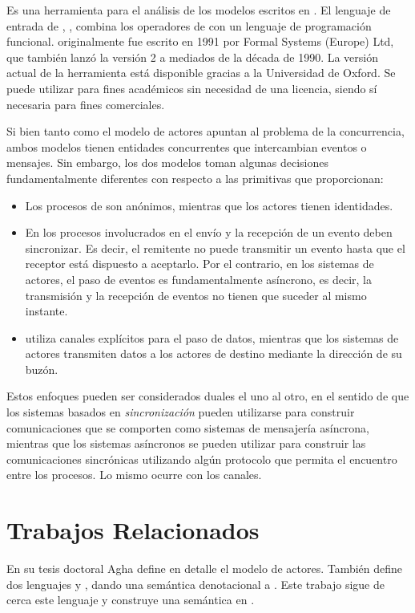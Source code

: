 Es una herramienta para el análisis de los modelos escritos en \CSP. El lenguaje de entrada de \FDR, \CSPm, combina los operadores de \CSP con un lenguaje de programación funcional. \FDR originalmente fue escrito en 1991 por Formal Systems (Europe) Ltd, que también lanzó la versión 2 a mediados de la década de 1990. La versión actual de la herramienta está disponible gracias a la Universidad de Oxford. Se puede utilizar para fines académicos sin necesidad de una licencia, siendo sí necesaria para fines comerciales.

Si bien tanto \CSP como el modelo de actores apuntan al problema de la concurrencia, ambos modelos tienen entidades concurrentes que intercambian eventos o mensajes. Sin embargo, los dos modelos toman algunas decisiones fundamentalmente diferentes con respecto a las primitivas que proporcionan:

\begin{itemize}
\item Los procesos de \CSP son anónimos, mientras que los actores tienen identidades.
\item En \CSP los procesos involucrados en el envío y la recepción de un evento deben sincronizar. Es decir, el remitente no puede transmitir un evento hasta que el receptor está dispuesto a aceptarlo. Por el contrario, en los sistemas de actores, el paso de eventos es fundamentalmente asíncrono, es decir, la transmisión y la recepción de eventos no tienen que suceder al mismo instante.
\item \CSP utiliza canales explícitos para el paso de datos, mientras que los sistemas de actores transmiten datos a los actores de destino mediante la dirección de su buzón.
\end{itemize}

Estos enfoques pueden ser considerados duales el uno al otro, en el sentido de que los sistemas basados en \emph{sincronización} pueden utilizarse para construir comunicaciones que se comporten como sistemas de mensajería asíncrona, mientras que los sistemas asíncronos se pueden utilizar para construir las comunicaciones sincrónicas utilizando algún protocolo que permita el encuentro entre los procesos. Lo mismo ocurre con los canales.

\section{Trabajos Relacionados}

En su tesis doctoral Agha\cite{Agha:1986:AMC:7929} define en detalle el modelo de actores. También define dos lenguajes \SAL y \ACT, dando una semántica denotacional a \SAL. Este trabajo sigue de cerca este lenguaje y construye una semántica en \CSP.

